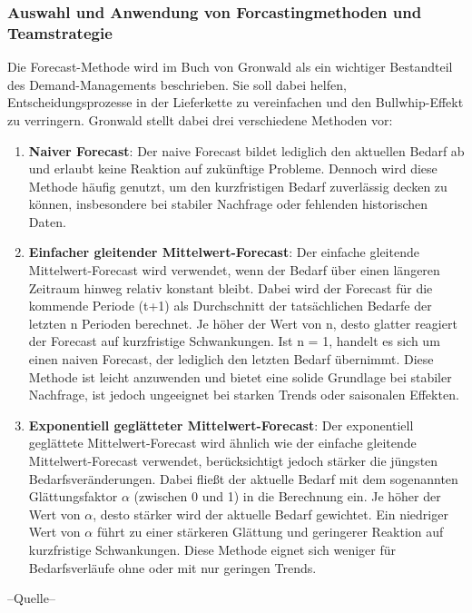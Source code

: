 \documentclass[a4paper,12pt]{article}
\begin{document}
\subsubsection{Auswahl und Anwendung von Forcastingmethoden und Teamstrategie}
Die Forecast-Methode wird im Buch von Gronwald als ein wichtiger Bestandteil des Demand-Managements beschrieben.
Sie soll dabei helfen, Entscheidungsprozesse in der Lieferkette zu vereinfachen und den Bullwhip-Effekt zu verringern.
Gronwald stellt dabei drei verschiedene Methoden vor:
\begin{enumerate}
    \item \textbf{Naiver Forecast}:\newline
    Der naive Forecast bildet lediglich den aktuellen Bedarf ab und erlaubt keine Reaktion auf zukünftige Probleme.
    Dennoch wird diese Methode häufig genutzt, um den kurzfristigen Bedarf zuverlässig decken zu können,
    insbesondere bei stabiler Nachfrage oder fehlenden historischen Daten.
    \item \textbf{Einfacher gleitender Mittelwert-Forecast}:\newline
    Der einfache gleitende Mittelwert-Forecast wird verwendet, wenn der Bedarf über einen längeren Zeitraum hinweg relativ konstant bleibt.
    Dabei wird der Forecast für die kommende Periode (t+1) als Durchschnitt der tatsächlichen Bedarfe der letzten n Perioden berechnet.
    Je höher der Wert von n, desto glatter reagiert der Forecast auf kurzfristige Schwankungen.
    Ist n = 1, handelt es sich um einen naiven Forecast, der lediglich den letzten Bedarf übernimmt.
    Diese Methode ist leicht anzuwenden und bietet eine solide Grundlage bei stabiler Nachfrage,
    ist jedoch ungeeignet bei starken Trends oder saisonalen Effekten.
    \item \textbf{Exponentiell geglätteter Mittelwert-Forecast}:\newline
    Der exponentiell geglättete Mittelwert-Forecast wird ähnlich wie der einfache gleitende Mittelwert-Forecast verwendet,
    berücksichtigt jedoch stärker die jüngsten Bedarfsveränderungen.
    Dabei fließt der aktuelle Bedarf mit dem sogenannten Glättungsfaktor $\alpha$ (zwischen 0 und 1) in die Berechnung ein.
    Je höher der Wert von $\alpha$, desto stärker wird der aktuelle Bedarf gewichtet.
    Ein niedriger Wert von $\alpha$ führt zu einer stärkeren Glättung und geringerer Reaktion auf kurzfristige Schwankungen.
    Diese Methode eignet sich weniger für Bedarfsverläufe ohne oder mit nur geringen Trends.
\end{enumerate}
--Quelle--
\end{document}
